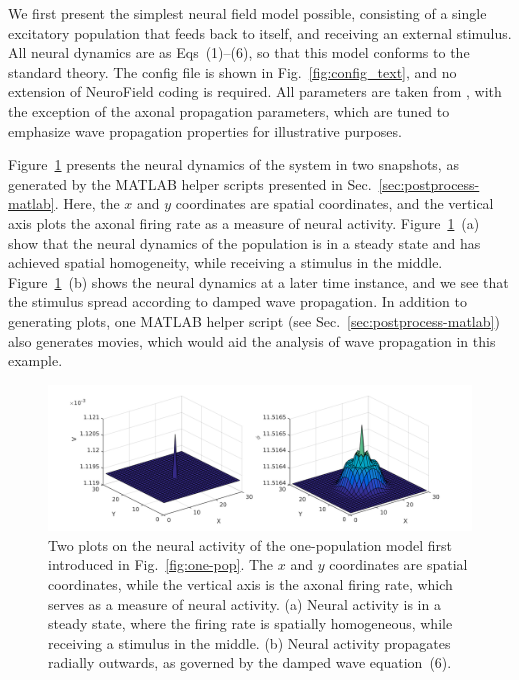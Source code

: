 \documentclass[preprint,review,10pt,authoryear,letterpaper]{elsarticle}
\begin{document}
We first present the simplest neural field model possible, consisting of a single excitatory population that feeds back to itself, and receiving an external stimulus. All neural dynamics are as Eqs~(1)--(6), so that this model conforms to the standard \citet{Robinson2005} theory. The config file is shown in Fig.~\ref{fig:config_text}, and no extension of NeuroField coding is required. All parameters are taken from \citet{Robinson:04aa}, with the exception of the axonal propagation parameters, which are tuned to emphasize wave propagation properties for illustrative purposes.

Figure~\ref{fig:wave_comparison} presents the neural dynamics of the system in two snapshots, as generated by the MATLAB helper scripts presented in Sec.~\ref{sec:postprocess-matlab}. Here, the \(x\) and \(y\) coordinates are spatial coordinates, and the vertical axis plots the axonal firing rate as a measure of neural activity. Figure~\ref{fig:wave_comparison}~(a) show that the neural dynamics of the population is in a steady state and has achieved spatial homogeneity, while receiving a stimulus in the middle. Figure~\ref{fig:wave_comparison}~(b) shows the neural dynamics at a later time instance, and we see that the stimulus spread according to damped wave propagation. In addition to generating plots, one MATLAB helper script (see Sec.~\ref{sec:postprocess-matlab}) also generates movies, which would aid the analysis of wave propagation in this example.


\begin{figure}[t]
\begin{center}
\includegraphics[width=.9\textwidth]{wave_comparison}
\caption{Two plots on the neural activity of the one-population model first introduced in Fig.~\ref{fig:one-pop}. The \(x\) and \(y\) coordinates are spatial coordinates, while the vertical axis is the axonal firing rate, which serves as a measure of neural activity. (a) Neural activity is in a steady state, where the firing rate is spatially homogeneous, while receiving a stimulus in the middle. (b) Neural activity propagates radially outwards, as governed by the damped wave equation~(6).}
\label{fig:wave_comparison}
\end{center}
\end{figure}
\end{document}
